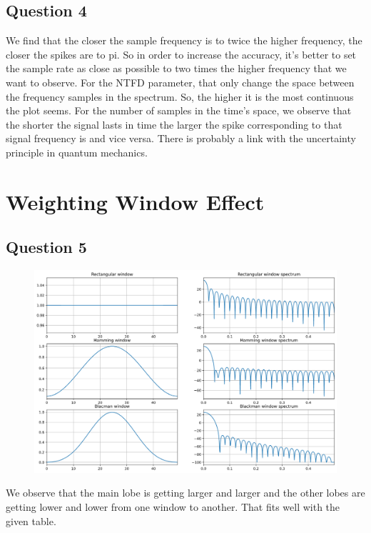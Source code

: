 \documentclass[]{article}
\begin{document}
\subsection*{Question 4}

We find that the closer the sample frequency is to twice the higher frequency, the closer the spikes are to pi.
So in order to increase the accuracy, it's better to set the sample rate as close as possible
to two times the higher frequency that we want to observe. 
For the NTFD parameter, that only change the space between the frequency samples in the spectrum.
So, the higher it is the most continuous the plot seems. 
For the number of samples in the time's space, we observe that the shorter the signal lasts in time the larger the spike corresponding to
that signal frequency is and vice versa. There is probably a link with the uncertainty principle in quantum mechanics.


\section{Weighting Window Effect}
\subsection*{Question 5}

\begin{figure}[H]
    \centering
\includegraphics[scale=0.25]{q5.png}
\end{figure}

We observe that the main lobe is getting larger and larger and the other lobes are getting lower and lower from one window to another.
That fits well with the given table.
\end{document}
